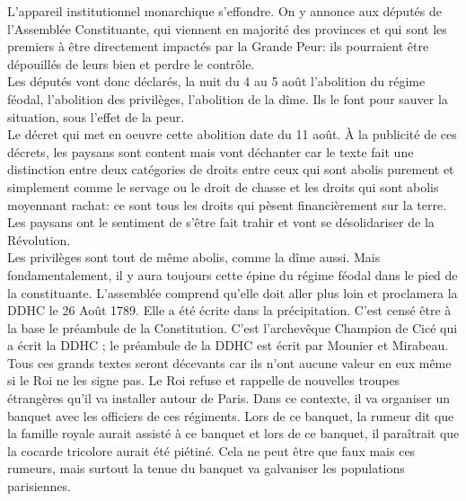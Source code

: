 \documentclass[10pt, a4paper, openany]{book}
\begin{document}
L'appareil institutionnel monarchique s'effondre. On y annonce aux députés de l'Assemblée Constituante, qui viennent en majorité des provinces et qui sont les premiers à être directement impactés par la Grande Peur: ils pourraient être dépouillés de leurs bien et perdre le contrôle. \\
Les députés vont donc déclarés, la nuit du 4 au 5 août l'abolition du régime féodal, l'abolition des privilèges, l'abolition de la dîme. Ils le font pour sauver la situation, sous l'effet de la peur. \\
Le décret qui met en oeuvre cette abolition date du 11 août. À la publicité de ces décrets, les paysans sont content mais vont déchanter car le texte fait une distinction entre deux catégories de droits entre ceux qui sont abolis purement et simplement comme le servage ou le droit de chasse et les droits qui sont abolis moyennant rachat: ce sont tous les droits qui pèsent financièrement sur la terre. Les paysans ont le sentiment de s'être fait trahir et vont se désolidariser de la Révolution. \\
Les privilèges sont tout de même abolis, comme la dîme aussi. Mais fondamentalement, il y aura toujours cette épine du régime féodal dans le pied de la constituante. L'assemblée comprend qu'elle doit aller plus loin et proclamera la DDHC le 26 Août 1789. Elle a été écrite dans la précipitation. C'est censé être à la base le préambule de la Constitution. C'est l'archevêque Champion de Cicé qui a écrit la DDHC ; le préambule de la DDHC est écrit par Mounier et Mirabeau. \\
Tous ces grands textes seront décevants car ils n'ont aucune valeur en eux même si le Roi ne les signe pas. Le Roi refuse et rappelle de nouvelles troupes étrangères qu'il va installer autour de Paris. Dans ce contexte, il va organiser un banquet avec les officiers de ces régiments. Lors de ce banquet, la rumeur dit que la famille royale aurait assisté à ce banquet et lors de ce banquet, il paraîtrait que la cocarde tricolore aurait été piétiné. Cela ne peut être que faux mais ces rumeurs, mais surtout la tenue du banquet va galvaniser les populations parisiennes.
\end{document}
